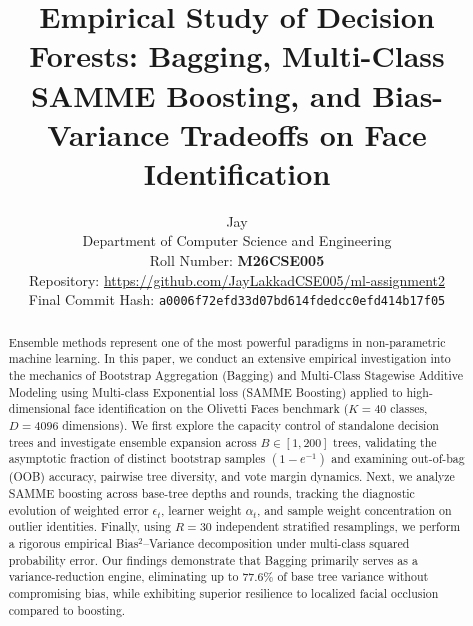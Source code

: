 \documentclass[10pt,twocolumn,letterpaper]{article}
\begin{document}
\title{Empirical Study of Decision Forests: Bagging, Multi-Class SAMME Boosting, and Bias-Variance Tradeoffs on Face Identification}

\author{
Jay\\
Department of Computer Science and Engineering\\
Roll Number: \textbf{M26CSE005} \\
Repository: \url{https://github.com/JayLakkadCSE005/ml-assignment2} \\
Final Commit Hash: \texttt{a0006f72efd33d07bd614fdedcc0efd414b17f05}
}

\maketitle

\begin{abstract}
Ensemble methods represent one of the most powerful paradigms in non-parametric machine learning. In this paper, we conduct an extensive empirical investigation into the mechanics of Bootstrap Aggregation (Bagging) and Multi-Class Stagewise Additive Modeling using Multi-class Exponential loss (SAMME Boosting) applied to high-dimensional face identification on the Olivetti Faces benchmark ($K=40$ classes, $D=4096$ dimensions). We first explore the capacity control of standalone decision trees and investigate ensemble expansion across $B \in [1, 200]$ trees, validating the asymptotic fraction of distinct bootstrap samples $(1-e^{-1})$ and examining out-of-bag (OOB) accuracy, pairwise tree diversity, and vote margin dynamics. Next, we analyze SAMME boosting across base-tree depths and rounds, tracking the diagnostic evolution of weighted error $\epsilon_t$, learner weight $\alpha_t$, and sample weight concentration on outlier identities. Finally, using $R=30$ independent stratified resamplings, we perform a rigorous empirical Bias$^2$--Variance decomposition under multi-class squared probability error. Our findings demonstrate that Bagging primarily serves as a variance-reduction engine, eliminating up to $77.6\%$ of base tree variance without compromising bias, while exhibiting superior resilience to localized facial occlusion compared to boosting.
\end{abstract}

\end{document}

